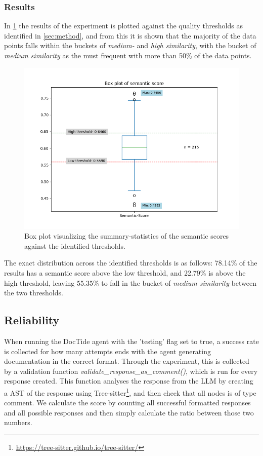 \subsubsection{Results}
In \cref{fig:sem_box} the results of the experiment is plotted against the quality thresholds as identified in \cref{sec:method}, and from this it is shown that the majority of the data points falls within the buckets of \textit{medium-} and \textit{high similarity}, with the bucket of \textit{medium similarity} as the must frequent with more than 50\% of the data points.

\label{sec:sem_results}
\begin{figure}[H]
\centering
\includegraphics[width=0.7\linewidth]{Figures/semantic_score_box_plot.png}
\caption{Box plot visualizing the summary-statistics of the semantic scores against the identified thresholds.}
\label{fig:sem_box}
\end{figure}

\noindent
The exact distribution across the identified thresholds is as follows: 78.14\% of the results has a semantic score above the low threshold, and 22.79\% is above the high threshold, leaving 55.35\% to fall in the bucket of \textit{medium similarity} between the two thresholds.

\subsection{Reliability}
When running the DocTide agent with the 'testing' flag set to true, a success rate is collected for how many attempts ends with the agent generating documentation in the correct format.
Through the experiment, this is collected by a validation function \textit{validate\_response\_as\_comment()}, which is run for every response created. This function analyses the response from the LLM by creating a AST of the response using Tree-sitter\footnote{\url{https://tree-sitter.github.io/tree-sitter/}}, and then check that all nodes is of type comment.
We calculate the score by counting all successful formatted responses and all possible responses and then simply calculate the ratio between those two numbers.
